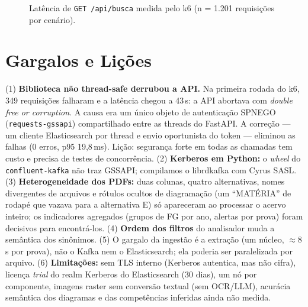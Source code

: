 \documentclass[12pt]{article}
\newcommand{\cod}[1]{\texttt{\small #1}}
\begin{document}
\begin{figure}[ht]
\centering
{}
\caption{Latência de \cod{GET /api/busca} medida pelo k6 (n = 1.201 requisições por cenário).}
\label{fig:lat}
\end{figure}

\section{Gargalos e Lições}\label{sec:licoes}

(1) \textbf{Biblioteca não thread-safe derrubou a API.} Na primeira rodada do k6, 349 requisições falharam e a
latência chegou a 43\,s: a API abortava com \textit{double free or corruption}. A causa era um único objeto de
autenticação SPNEGO (\cod{requests-gssapi}) compartilhado entre as threads do FastAPI. A correção --- um cliente
Elasticsearch por thread e envio oportunista do token --- eliminou as falhas (0 erros, p95 19,8\,ms). Lição:
segurança forte em todas as chamadas tem custo e precisa de testes de concorrência. (2) \textbf{Kerberos em
Python:} o \textit{wheel} do \cod{confluent-kafka} não traz GSSAPI; compilamos o librdkafka com Cyrus SASL. (3)
\textbf{Heterogeneidade dos PDFs:} duas colunas, quatro alternativas, nomes divergentes de arquivos e rótulos
ocultos de diagramação (um ``MATÉRIA'' de rodapé que vazava para a alternativa E) só apareceram ao processar o
acervo inteiro; os indicadores agregados (grupos de FG por ano, alertas por prova) foram decisivos para
encontrá-los. (4) \textbf{Ordem dos filtros} do analisador muda a semântica dos sinônimos. (5) O gargalo da
ingestão é a extração (um núcleo, $\approx$8\,s por prova), não o Kafka nem o Elasticsearch; ela poderia ser
paralelizada por arquivo. (6) \textbf{Limitações:} sem TLS interno (Kerberos autentica, mas não cifra), licença
\textit{trial} do realm Kerberos do Elasticsearch (30 dias), um nó por componente, imagens raster sem conversão textual (sem OCR/LLM), acurácia semântica dos
diagramas e das competências inferidas ainda não medida.
\end{document}

